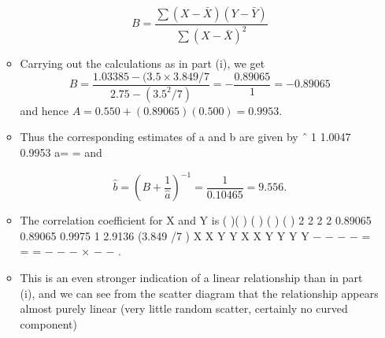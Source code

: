 \documentclass[a4paper,12pt]{article}
\begin{document}
\begin{enumerate}
\begin{itemize}
\[ B = \frac{\sum(X-\bar{X})(Y-\bar{Y})}{\sum(X-\bar{X})^2 }\]
\item  Carrying out the calculations as in part (i), we get
\[ B  = \frac{1.03385 - (3.5 \times 3.849/7}{2.75 - (3.5^2/7)} = - \frac{0.89065}{1}
= -0.89065\]
and hence $A = 0.550 + (0.89065)(0.500) = 0.9953$.
\item Thus the corresponding estimates of a and b are given by ˆ 1 1.0047
0.9953
a= = and


\[  \hat{b} = \left( B + \frac{1}{\hat{a} }  \right)^{-1} = \frac{1}{0.10465} = 9.556.\]

\item The correlation coefficient for X and Y is
( )( )
( ) ( ) ( ) 2 2 2 2
0.89065 0.89065 0.9975
1 2.9136 (3.849 /7 )
X X Y Y
X X Y Y Y Y
\sum − − − − = = = −
\sum − \sum − × \sum − −
.
\item This is an even stronger indication of a linear relationship than in part (i), and we can
see from the scatter diagram that the relationship appears almost purely linear (very
little random scatter, certainly no curved component)
\end{itemize}

\end{enumerate}
\end{document}
